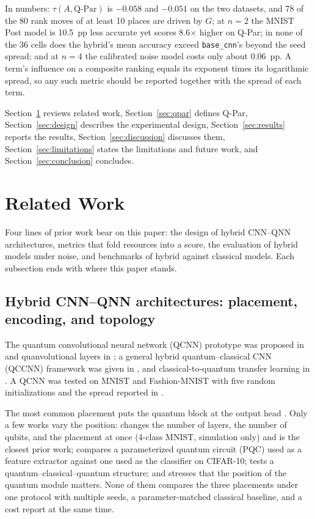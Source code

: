 \documentclass{ieeeaccess}
\newcommand{\QP}{\text{Q-Par}}                %
\begin{document}
In numbers: $\tau(A, \QP)$ is $-0.058$ and $-0.051$ on the two datasets, and 78 of the 80 rank moves of at least 10 places are driven by $G$; at $n = 2$ the MNIST Post model is 10.5~pp less accurate yet scores 8.6$\times$ higher on Q-Par; in none of the 36 cells does the hybrid's mean accuracy exceed \texttt{base\_cnn}'s beyond the seed spread; and at $n = 4$ the calibrated noise model costs only about 0.06~pp. A term's influence on a composite ranking equals its exponent times its logarithmic spread, so any such metric should be reported together with the spread of each term.

Section~\ref{sec:related} reviews related work, Section~\ref{sec:qpar} defines Q-Par, Section~\ref{sec:design} describes the experimental design, Section~\ref{sec:results} reports the results, Section~\ref{sec:discussion} discusses them, Section~\ref{sec:limitations} states the limitations and future work, and Section~\ref{sec:conclusion} concludes.

\section{Related Work}
\label{sec:related}

Four lines of prior work bear on this paper: the design of hybrid CNN--QNN architectures, metrics that fold resources into a score, the evaluation of hybrid models under noise, and benchmarks of hybrid against classical models. Each subsection ends with where this paper stands.

\subsection{Hybrid CNN--QNN architectures: placement, encoding, and topology}
\label{sec:rw-arch}

The quantum convolutional neural network (QCNN) prototype was proposed in \cite{cong2019qcnn} and quanvolutional layers in \cite{henderson2020quanvolutional}; a general hybrid quantum--classical CNN (QCCNN) framework was given in \cite{liu2021hybrid}, and classical-to-quantum transfer learning in \cite{mari2020transfer}. A QCNN was tested on MNIST and Fashion-MNIST with five random initializations and the spread reported in \cite{hur2022qcnn}.

The most common placement puts the quantum block at the output head \cite{ranga2024hybrid,mari2020transfer,liu2024cqhnet}. Only a few works vary the position: \cite{zaman2024comparative} changes the number of layers, the number of qubits, and the placement at once (4-class MNIST, simulation only) and is the closest prior work; \cite{amadoun2026placement} compares a parameterized quantum circuit (PQC) used as a feature extractor against one used as the classifier on CIFAR-10; \cite{long2025qcq} tests a quantum--classical--quantum structure; and \cite{jain2026qufex} stresses that the position of the quantum module matters. None of them compares the three placements under one protocol with multiple seeds, a parameter-matched classical baseline, and a cost report at the same time.
\end{document}
